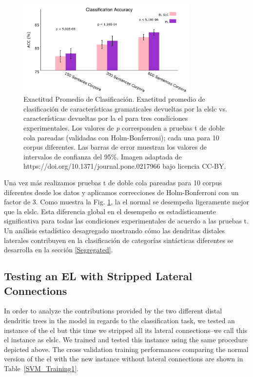 {\begin{figure}[ht!]
    \centering
    \includegraphics[width=0.8\textwidth]{PLOT2.png}
    \caption{Exactitud Promedio de Clasificación. Exactitud promedio de clasificación de características gramaticales devueltas por la \gls{elslc} vs. características devueltas por la \gls{el} para tres condiciones experimentales. Los valores de \emph{p} corresponden a pruebas t de doble cola pareadas (validadas con Holm-Bonferroni); cada una para 10 corpus diferentes. Las barras de error muestran los valores de intervalos de confianza del 95\%. Imagen adaptada de https://doi.org/10.1371/journal.pone.0217966 bajo licencia CC-BY.}
    \label{fig:PLOT2}
\end{figure}

Una vez más realizamos pruebas t de doble cola pareadas para 10 corpus diferentes desde los datos y aplicamos correcciones de Holm-Bonferroni con un factor de 3.
Como muestra la Fig. \ref{fig:PLOT2}, la \gls{el} normal se desempeña ligeramente mejor que la \gls{elslc}.
Esta diferencia global en el desempeño es estadísticamente significativa para todas las condiciones experimentales de acuerdo a las pruebas t.
Un análisis estadístico desagregado mostrando cómo las dendritas distales laterales contribuyen en la clasificación de categorías sintácticas diferentes se desarrolla en la sección \ref{Segregated}.
}{
\subsection{Testing an EL with Stripped Lateral Connections}
\label{slc}

In order to analyze the contributions provided by the two different distal dendritic trees in the model in regards to the classification task, we tested an instance of the \gls{el} but this time we stripped all its lateral connections--we call this \gls{el} instance as \gls{elslc}. We trained and tested this instance using the same procedure depicted above.
The cross validation training performances comparing the normal version of the \gls{el} with the new instance without lateral connections are shown in Table~\ref{SVM_Training1}.

}
